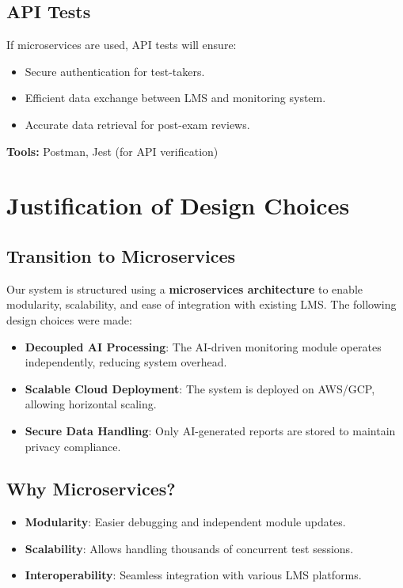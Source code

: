 \documentclass[12pt,a4paper]{article}
\begin{document}
\subsection{API Tests}
If microservices are used, API tests will ensure:
\begin{itemize}
\item Secure authentication for test-takers.
\item Efficient data exchange between LMS and monitoring system.
\item Accurate data retrieval for post-exam reviews.
\end{itemize}
\textbf{Tools:} Postman, Jest (for API verification)

\section{Justification of Design Choices}

\subsection{Transition to Microservices}
Our system is structured using a \textbf{microservices architecture} to enable modularity, scalability, and ease of integration with existing LMS. The following design choices were made:
\begin{itemize}
\item \textbf{Decoupled AI Processing}: The AI-driven monitoring module operates independently, reducing system overhead.
\item \textbf{Scalable Cloud Deployment}: The system is deployed on AWS/GCP, allowing horizontal scaling.
\item \textbf{Secure Data Handling}: Only AI-generated reports are stored to maintain privacy compliance.
\end{itemize}

\subsection{Why Microservices?}
\begin{itemize}
\item \textbf{Modularity}: Easier debugging and independent module updates.
\item \textbf{Scalability}: Allows handling thousands of concurrent test sessions.
\item \textbf{Interoperability}: Seamless integration with various LMS platforms.
\end{itemize}
\end{document}
